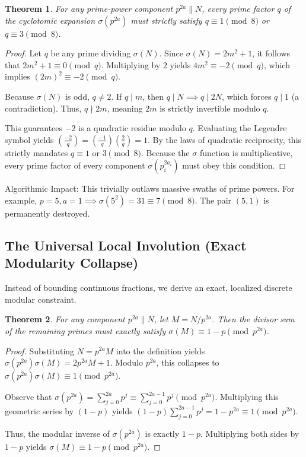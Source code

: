 \documentclass[11pt,a4paper]{article}
\newtheorem{theorem}{Theorem}
\begin{document}
\begin{theorem}
For any prime-power component $p^{2a} \parallel N$, every prime factor $q$ of the cyclotomic expansion $\sigma(p^{2a})$ must strictly satisfy $q \equiv 1 \pmod 8$ or $q \equiv 3 \pmod 8$.
\end{theorem}
\begin{proof}
Let $q$ be any prime dividing $\sigma(N)$. Since $\sigma(N) = 2m^2 + 1$, it follows that $2m^2 + 1 \equiv 0 \pmod q$. Multiplying by 2 yields $4m^2 \equiv -2 \pmod q$, which implies $(2m)^2 \equiv -2 \pmod q$.

Because $\sigma(N)$ is odd, $q \neq 2$. If $q \mid m$, then $q \mid N \implies q \mid 2N$, which forces $q \mid 1$ (a contradiction). Thus, $q \nmid 2m$, meaning $2m$ is strictly invertible modulo $q$.

This guarantees $-2$ is a quadratic residue modulo $q$. Evaluating the Legendre symbol yields $\left( \frac{-2}{q} \right) = \left( \frac{-1}{q} \right) \left( \frac{2}{q} \right) = 1$. By the laws of quadratic reciprocity, this strictly mandates $q \equiv 1 \text{ or } 3 \pmod 8$. Because the $\sigma$ function is multiplicative, every prime factor of every component $\sigma(p_i^{2a_i})$ must obey this condition.
\end{proof}

Algorithmic Impact: This trivially outlaws massive swaths of prime powers. For example, $p=5, a=1 \implies \sigma(5^2) = 31 \equiv 7 \pmod 8$. The pair $(5, 1)$ is permanently destroyed.

\subsection{The Universal Local Involution (Exact Modularity Collapse)}
Instead of bounding continuous fractions, we derive an exact, localized discrete modular constraint.

\begin{theorem}
For any component $p^{2a} \parallel N$, let $M = N / p^{2a}$. Then the divisor sum of the remaining primes must exactly satisfy $\sigma(M) \equiv 1 - p \pmod{p^{2a}}$.
\end{theorem}
\begin{proof}
Substituting $N = p^{2a}M$ into the definition yields $\sigma(p^{2a})\sigma(M) = 2p^{2a}M + 1$.
Modulo $p^{2a}$, this collapses to $\sigma(p^{2a})\sigma(M) \equiv 1 \pmod{p^{2a}}$.

Observe that $\sigma(p^{2a}) = \sum_{j=0}^{2a} p^j \equiv \sum_{j=0}^{2a-1} p^j \pmod{p^{2a}}$.
Multiplying this geometric series by $(1-p)$ yields $(1-p)\sum_{j=0}^{2a-1} p^j = 1 - p^{2a} \equiv 1 \pmod{p^{2a}}$.

Thus, the modular inverse of $\sigma(p^{2a})$ is exactly $1-p$. Multiplying both sides by $1-p$ yields $\sigma(M) \equiv 1 - p \pmod{p^{2a}}$.
\end{proof}
\end{document}
